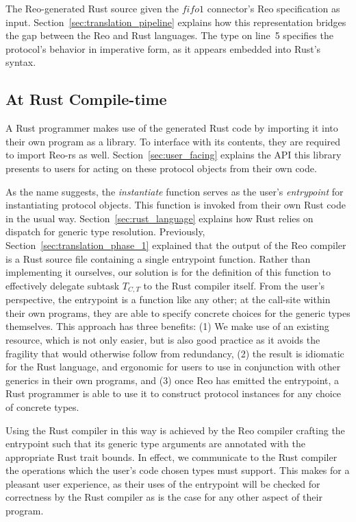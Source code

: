 \begin{listing}[ht]
	\centering
	\inputminted[]{rust}{generated.rs}
	\caption[TODO.]{The Reo-generated Rust source given the $fifo1$ connector's Reo specification as input. Section~\ref{sec:translation_pipeline} explains how this representation bridges the gap between the Reo and Rust languages. The  type on line~5 specifies the protocol's behavior in imperative form, as it appears embedded into Rust's syntax.}
	\label{listing:generated}
\end{listing}

\subsection{At Rust Compile-time}
A Rust programmer makes use of the generated Rust code by importing it into their own program as a library. To interface with its contents, they are required to import Reo-rs as well. Section~\ref{sec:user_facing} explains the API this library presents to users for acting on these protocol objects from their own code. 

As the name suggests, the \textit{instantiate} function serves as the user's \textit{entrypoint} for instantiating protocol objects. This function is invoked from their own Rust code in the usual way. Section~\ref{sec:rust_language} explains how Rust relies on dispatch for generic type resolution. Previously, Section~\ref{sec:translation_phase_1} explained that the output of the Reo compiler is a Rust source file containing a single entrypoint function. Rather than implementing it ourselves, our solution is for the definition of this function to effectively delegate subtask $T_{C,T}$ to the Rust compiler itself. From the user's perspective, the entrypoint is a function like any other; at the call-site within their own programs, they are able to specify concrete choices for the generic types themselves.
This approach has three benefits: (1) We make use of an existing resource, which is not only easier, but is also good practice as it avoids the fragility that would otherwise follow from redundancy, (2) the result is idiomatic for the Rust language, and ergonomic for users to use in conjunction with other generics in their own programs, and (3) once Reo has emitted the entrypoint, a Rust programmer is able to use it to construct protocol instances for any choice of concrete types.

Using the Rust compiler in this way is achieved by the Reo compiler crafting the entrypoint such that its generic type arguments are annotated with the appropriate Rust trait bounds. In effect, we communicate to the Rust compiler the operations which the user's code chosen types must support. This makes for a pleasant user experience, as their uses of the entrypoint will be checked for correctness by the Rust compiler as is the case for any other aspect of their program.

